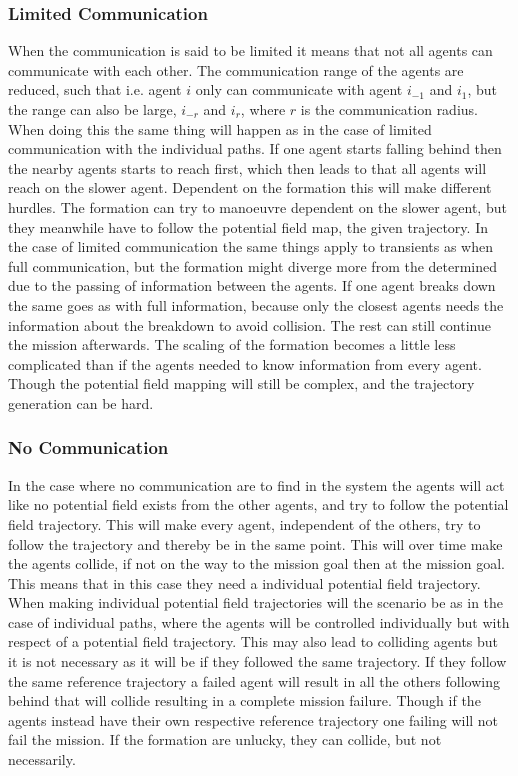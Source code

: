 \subsubsection{Limited Communication}
When the communication is said to be limited it means that not all agents can communicate with each other. The communication range of the agents are reduced, such that i.e. agent $i$ only can communicate with agent $i_{-1}$ and $i_{1}$, but the range can also be large, $i_{-r}$ and $i_{r}$, where $r$ is the communication radius. When doing this the same thing will happen as in the case of limited communication with the individual paths. If one agent starts falling behind then the nearby agents starts to reach first, which then leads to that all agents will reach on the slower agent. Dependent on the formation this will make different hurdles. The formation can try to manoeuvre dependent on the slower agent, but they meanwhile have to follow the potential field map, the given trajectory. In the case of limited communication the same things apply to transients as when full communication, but the formation might diverge more from the determined due to the passing of information between the agents. If one agent breaks down the same goes as with full information, because only the closest agents needs the information about the breakdown to avoid collision. The rest can still continue the mission afterwards. The scaling of the formation becomes a little less complicated than if the agents needed to know information from every agent. Though the potential field mapping will still be complex, and the trajectory generation can be hard.

\subsubsection{No Communication}
In the case where no communication are to find in the system the agents will act like no potential field exists from the other agents, and try to follow the potential field trajectory. This will make every agent, independent of the others, try to follow the trajectory and thereby be in the same point. This will over time make the agents collide, if not on the way to the mission goal then at the mission goal. This means that in this case they need a individual potential field trajectory. When making individual potential field trajectories will the scenario be as in the case of individual paths, where the agents will be controlled individually but with respect of a potential field trajectory. This may also lead to colliding agents but it is not necessary as it will be if they followed the same trajectory. If they follow the same reference trajectory a failed agent will result in all the others following behind that will collide resulting in a complete mission failure. Though if the agents instead have their own respective reference trajectory one failing will not fail the mission. If the formation are unlucky, they can collide, but not necessarily.


